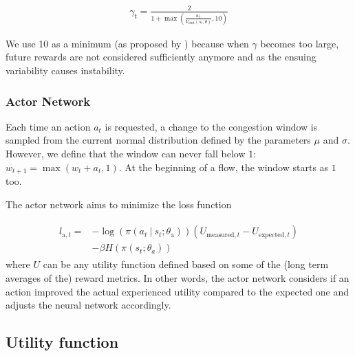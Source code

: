 \documentclass[10pt,sigconf,anonymous]{acmart}
\newcommand\givenbase[1][]{\:#1\lvert\:}
\let\given\givenbase
\begin{document}
\begin{align}
\gamma_t = \frac{2}{1+\max(\frac{w_t}{V_\text{sent}(s_t; \theta)},10)}
\end{align}

We use 10 as a minimum (as proposed by \cite{dong_pcc:_2015}) because when $\gamma$ becomes too large, future rewards are not considered sufficiently anymore and as the ensuing variability causes instability. 

\subsubsection{Actor Network}
\label{subsubsec:actor}

Each time an action $a_t$ is requested, a change to the congestion window is sampled from the current normal distribution defined by the parameters $\mu$ and $\sigma$. However, we define that the window can never fall below $1$: $w_{t+1} = \max(w_t + a_t, 1)$. At the beginning of a flow, the window starts as $1$ too.  

The actor network aims to minimize the loss function

\begin{align}
\begin{split}
l_{\text{a},t} =& -\log \left( \pi \left( a_t \given s_t ; \theta_\text{a} \right) \right)\left( U_{\text{measured},t} - U_{\text{expected},t} \right)\\ 
&- \beta H\left( \pi\left( s_t; \theta_a \right)\right)
\end{split}
\end{align}
where $U$ can be any utility function defined based on some of the (long term averages of the) reward metrics. In other words, the actor network considers if an action improved the actual experienced utility compared to the expected one and adjusts the neural network accordingly.
 
\subsection{Utility function}
\label{subsec:utility}
\end{document}
